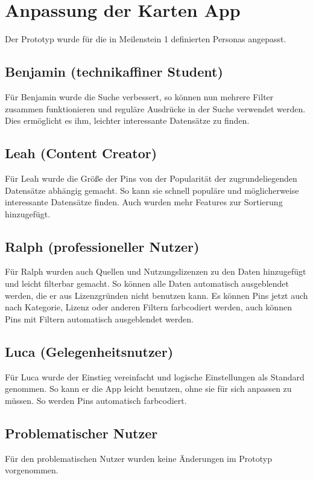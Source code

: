 \section{Anpassung der Karten App}
Der Prototyp wurde für die in Meilenstein 1 definierten Personas angepasst.

\subsection{Benjamin (technikaffiner Student)}
Für Benjamin wurde die Suche verbessert, so können nun mehrere Filter zusammen funktionieren und reguläre Ausdrücke in der Suche verwendet werden. Dies ermöglicht es ihm, leichter interessante Datensätze zu finden.

\subsection{Leah (Content Creator)}
Für Leah wurde die Größe der Pins von der Popularität der zugrundeliegenden Datensätze abhängig gemacht. So kann sie schnell populäre und möglicherweise interessante Datensätze finden. Auch wurden mehr Features zur Sortierung hinzugefügt.

\subsection{Ralph (professioneller Nutzer)}
Für Ralph wurden auch Quellen und Nutzungslizenzen zu den Daten hinzugefügt und leicht filterbar gemacht. So können alle Daten automatisch ausgeblendet werden, die er aus Lizenzgründen nicht benutzen kann. Es können Pins jetzt auch nach Kategorie, Lizenz oder anderen Filtern farbcodiert werden, auch können Pins mit Filtern automatisch ausgeblendet werden. 


\subsection{Luca (Gelegenheitsnutzer)}
Für Luca wurde der Einstieg vereinfacht und logische Einstellungen als Standard genommen. So kann er die App leicht benutzen, ohne sie für sich anpassen zu müssen. So werden Pins automatisch farbcodiert.

\subsection{Problematischer Nutzer}
Für den problematischen Nutzer wurden keine Änderungen im Prototyp vorgenommen.